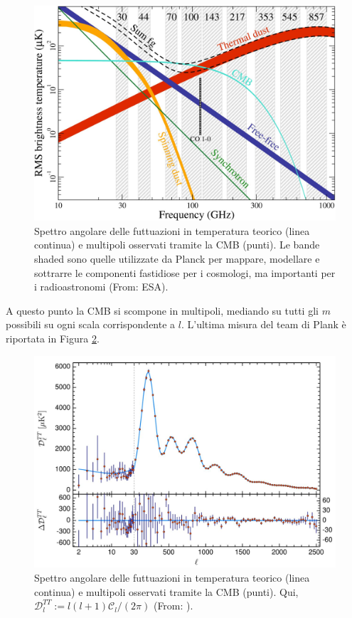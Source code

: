 \begin{figure}[H]
    \centering
    \includegraphics[width=0.8 \textwidth]{Pictures/11/falsecmb.jpg}
    \caption{Spettro angolare delle futtuazioni in temperatura teorico (linea continua) e multipoli osservati tramite la CMB (punti). Le bande shaded sono quelle utilizzate da Planck per mappare, modellare e sottrarre le componenti fastidiose per i cosmologi, ma importanti per i radioastronomi (From: ESA).}\label{fig11:cmbsporca}
\end{figure}

A questo punto la CMB si scompone in multipoli, mediando su tutti gli $m$ possibili su ogni scala corrispondente a $l$. L'ultima misura del team di Plank è riportata in Figura \ref{fig11:cttobs}. 


\begin{figure}[H]
    \centering
    \includegraphics[width=0.89 \textwidth]{Pictures/11/angspecobs.jpg}
    \caption{Spettro angolare delle futtuazioni in temperatura teorico (linea continua) e multipoli osservati tramite la CMB (punti). Qui, $\mathcal{D}^{TT}_l:= l(l+1)\mathcal{C}_l / (2\pi)$ (From: \cite{collaboration2018planck}).  }\label{fig11:cttobs} 
\end{figure}

